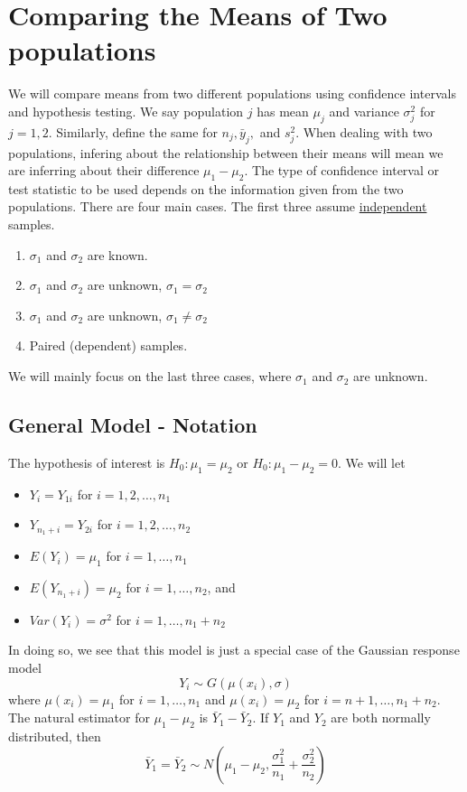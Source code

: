 \documentclass[12pt]{article}
\begin{document}
\section{Comparing the Means of Two populations}
We will compare means from two different populations using confidence intervals and hypothesis testing. We say population $j$ has mean $\mu_j$ and variance $\sigma_j^2$ for $j=1,2$. Similarly, define the same for $n_j, \bar y_j,$ and $s_j^2$. When dealing with two populations, infering about the relationship between their means will mean we are inferring about their difference $\mu_1-\mu_2$. The type of confidence interval or test statistic to be used depends on the information given from the two populations. There are four main cases. The first three assume \underline{independent} samples.
\begin{enumerate}
    \item $\sigma_1$ and $\sigma_2$ are known.
    \item $\sigma_1$ and $\sigma_2$ are unknown, $\sigma_1=\sigma_2$
    \item $\sigma_1$ and $\sigma_2$ are unknown, $\sigma_1\neq \sigma_2$
    \item Paired (dependent) samples.
\end{enumerate}
We will mainly focus on the last three cases, where $\sigma_1$ and $\sigma_2$ are unknown.

\subsection{General Model - Notation}
The hypothesis of interest is $H_0:\mu_1=\mu_2$ or $H_0:\mu_1-\mu_2=0$. We will let 
\begin{itemize}
    \item $Y_i=Y_{1i}$ for $i=1,2,\dots,n_1$
    \item $Y_{n_1+i}=Y_{2i}$ for $i=1,2,\dots,n_2$
    \item $E(Y_i)=\mu_1$ for $i=1,\dots,n_1$
    \item $E(Y_{n_1+i})=\mu_2$ for $i=1,\dots,n_2$, and 
    \item $Var(Y_i)=\sigma^2$ for $i=1,\dots,n_1+n_2$
\end{itemize}
In doing so, we see that this model is just a special case of the Gaussian response model
\[Y_i\sim G(\mu(x_i),\sigma)\] where $\mu(x_i)=\mu_1$ for $i=1,\dots,n_1$ and $\mu(x_i)=\mu_2$ for $i=n+1,\dots,n_1+n_2$. The natural estimator for $\mu_1-\mu_2$ is $\bar Y_1-\bar Y_2$. If $Y_1$ and $Y_2$ are both normally distributed, then \[\bar Y_1=\bar Y_2\sim N(\mu_1-\mu_2,\frac{\sigma^2_1}{n_1}+\frac{\sigma^2_2}{n_2})\]
\end{document}
